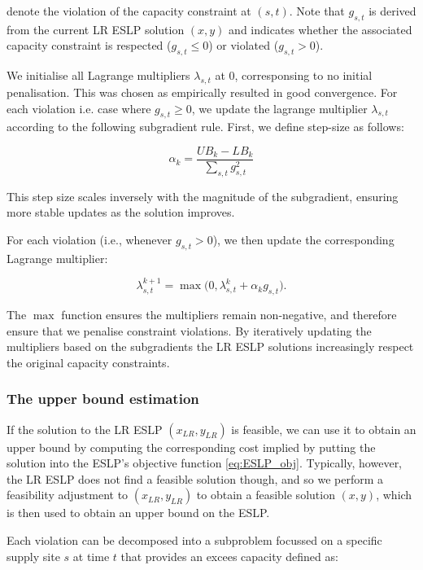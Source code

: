denote the violation of the capacity constraint at $(s,t)$. Note that $g_{s,t}$ is derived from 
the current LR ESLP solution $(x,y)$ and indicates whether the associated capacity constraint is 
respected ($g_{s,t} \leq 0$) or violated ($g_{s,t} > 0$).

We initialise all Lagrange multipliers $\lambda_{s,t}$ at $0$, corresponsing to no initial penalisation.
This was chosen as empirically resulted in good convergence.
For each violation i.e. case where $g_{s,t} \geq 0$, we update
the lagrange multiplier $\lambda_{s,t}$ according to the following subgradient rule. First, we define step-size as follows:

\begin{equation}\label{eq:subgradient}
    \alpha_k = \frac{UB_k - LB_k}{\sum_{s,t} g_{s,t}^2} 
\end{equation}

This step size scales inversely with the magnitude of the subgradient,
ensuring more stable updates as the solution improves.

For each violation (i.e., whenever $g_{s,t} > 0$), we then update the corresponding Lagrange multiplier:

\begin{equation}
    \lambda_{s,t}^{k+1} = \max\bigl(0, \lambda_{s,t}^{k} + \alpha_k g_{s,t}\bigr).
\end{equation}

The $\max$ function ensures the multipliers remain non-negative, and 
therefore ensure that we penalise constraint violations. By iteratively updating the multipliers based on the subgradients
the LR ESLP solutions increasingly respect the original capacity constraints.

\subsubsection{The upper bound estimation}

If the solution to the LR ESLP $(x_{LR}, y_{LR})$ is feasible, we can use it to obtain an upper bound
by computing the corresponding cost implied by putting the solution into the ESLP's objective function 
\ref{eq:ESLP_obj}. Typically, however, the LR ESLP does not find a feasible solution though, and so we 
perform a feasibility adjustment to $(x_{LR}, y_{LR})$ to obtain a feasible solution $(x, y)$, 
which is then used to obtain an upper bound on the ESLP. \par

Each violation can be decomposed into a subproblem focussed on a specific supply site $s$ at time $t$
that provides an excees capacity defined as:

